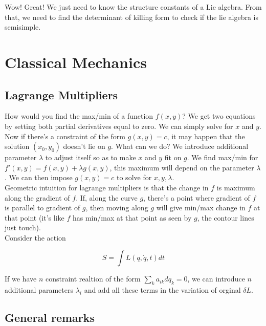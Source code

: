 \documentclass{report}
\begin{document}
\noindent Wow! Great! We just need to know the structure constants of a Lie algebra. From that, we need to find the determinant of killing form to check if the lie algebra is semisimple.

\chapter{Classical Mechanics}

\section{Lagrange Multipliers}

How would you find the max/min of a function $f(x,y)$? We get two equations by setting both partial derivatives equal to zero. We can simply solve for $x$ and $y$. Now if there's a constraint of the form $g(x,y)=c$, it may happen that the solution $(x_0,y_0)$ doesn't lie on $g$. What can we do? We introduce additional parameter $\lambda$ to adjust itself so as to make $x$ and $y$ fit on $g$. We find max/min for $f'(x,y)=f(x,y)+\lambda g(x,y)$, this maximum will depend on the parameter $\lambda$. We can then impose $g(x,y)=c$ to solve for $x,y,\lambda$. \\

\noindent Geometric intuition for lagrange multipliers is that the change in $f$ is maximum along the gradient of $f$. If, along the curve $g$, there's a point where gradient of $f$ is parallel to gradient of $g$, then moving along $g$ will give min/max change in $f$ at that point (it's like $f$ has min/max at that point as seen by $g$, the contour lines just touch).\\

\noindent Consider the action 

$$S = \int L(q,\dot{q},t) dt$$

\noindent If we have $n$ constraint realtion of the form $\sum_{k}a_{ik} dq_k = 0$, we can introduce $n$ additional parameters $\lambda_i$ and add all these terms in the variation of orginal $\delta L$.

\section{General remarks}
\end{document}

